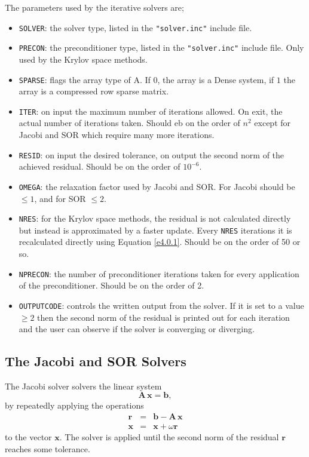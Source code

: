 The parameters used by the iterative solvers are;
\begin{itemize}
\item {\tt SOLVER}: the solver type, listed in the {\tt "solver.inc"} include 
      file.
\item {\tt PRECON}: the preconditioner type, listed in the {\tt "solver.inc"} 
      include file. Only used by the Krylov space methods.
\item {\tt SPARSE}: flags the array type of A. If $0$, the array is a Dense
      system, if $1$ the array is a compressed row sparse matrix.
\item {\tt ITER}: on input the maximum number of iterations allowed. On exit,
      the actual number of iterations taken. Should eb on the order of
      $n^2$ except for Jacobi and SOR which require many more iterations.
\item {\tt RESID}: on input the desired tolerance, on output the second norm
      of the achieved residual. Should be on the order of $10^{-6}$.
\item {\tt OMEGA}: the relaxation factor used by Jacobi and SOR. For Jacobi 
      should be $\le 1$, and for SOR $\le 2$.
\item {\tt NRES}: for the Krylov space methods, the residual is not calculated
      directly but instead is approximated by a faster update. Every {\tt NRES}
      iterations it is recalculated directly using Equation \ref{e4.0.1}.
      Should be on the order of 50 or so.
\item {\tt NPRECON}: the number of preconditioner iterations taken for every 
      application of the preconditioner. Should be on the order of 2.
\item {\tt OUTPUTCODE}: controls the written output from the solver. If it is
      set to a value $\ge 2$ then the second norm of the residual is printed 
      out for each iteration and the user can observe if the solver is 
      converging or diverging.
\end {itemize}

\clearpage

\subsection{The Jacobi and SOR Solvers}\label{s4.1}

The Jacobi solver solvers the linear system
\begin{equation}\label{e4.1.1}
\mathbf{A \, x = b},
\end{equation}
by repeatedly applying the operations
\begin{eqnarray}\label{e4.1.2}
\mathbf{r} & = & \mathbf{b - A \, x}\\
\mathbf{x} & = & \mathbf{x} + \omega \mathbf{r}
\end{eqnarray}
to the vector $\mathbf{x}$. The solver is applied until the second norm of 
the residual $\mathbf{r}$ reaches some tolerance.

